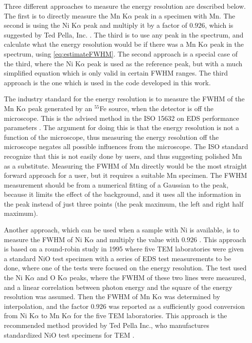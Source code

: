 Three different approaches to measure the energy resolution are described below.
The first is to directly measure the Mn K$\alpha$ peak in a specimen with Mn.
The second is using the Ni K$\alpha$ peak and multiply it by a factor of $0.926$, which is suggested by Ted Pella, Inc. \cite{ted_pella_nio_tem_2019}.
The third is to use any peak in the spectrum, and calculate what the energy resolution would be if there was a Mn K$\alpha$ peak in the spectrum, using \cref{eq:estimateFWHM}.
The second approach is a special case of the third, where the Ni K$\alpha$ peak is used as the reference peak, but with a much simplified equation which is only valid in certain FWHM ranges.
The third approach is the one which is used in the code developed in this work.


The industry standard for the energy resolution is to measure the FWHM of the Mn K$\alpha$ peak generated by an $^{55}$Fe source, when the detector is off the microscope.
This is the advised method in the ISO 15632 on EDS performance parameters \cite{iso_qc_15632}.
The argument for doing this is that the energy resolution is not a function of the microscope, thus measuring the energy resolution off the microscope negates all possible influences from the microscope.
The ISO standard recognize that this is not easily done by users, and thus suggesting polished Mn as a substitute.
Measuring the FWHM of Mn directly would be the most straight forward approach for a user, but it requires a suitable Mn specimen.
The FWHM measurement should be from a numerical fitting of a Gaussian to the peak, because it limits the effect of the background, and it uses all the information in the peak instead of just three points (the peak maximum, the left and right half maximum).


Another approach, which can be used when a sample with Ni is available, is to measure the FWHM of Ni K$\alpha$ and multiply the value with $0.926$ \cite{bennett_egerton_1995}.
This approach is based on a round-robin study in 1995 \cite{bennett_egerton_1995} where five TEM laboratories were given a standard NiO test specimen with a series of EDS test measurements to be done, where one of the tests were focused on the energy resolution.
The test used the Ni K$\alpha$ and O K$\alpha$ peaks, where the FWHM of these two lines were measured, and a linear correlation between photon energy and the square of the energy resolution was assumed.
Then the FWHM of Mn K$\alpha$ was determined by interpolation, and the factor $0.926$ was reported as a sufficiently good conversion from Ni K$\alpha$ to Mn K$\alpha$ for the five TEM laboratories.
This approach is the recommended method provided by Ted Pella Inc., who manufactures standardized NiO test specimens for TEM \cite{egerton_nio_characterization_1994,ted_pella_nio_tem_2019}.


